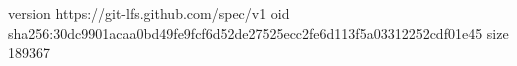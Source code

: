 version https://git-lfs.github.com/spec/v1
oid sha256:30dc9901acaa0bd49fe9fcf6d52de27525ecc2fe6d113f5a03312252cdf01e45
size 189367
